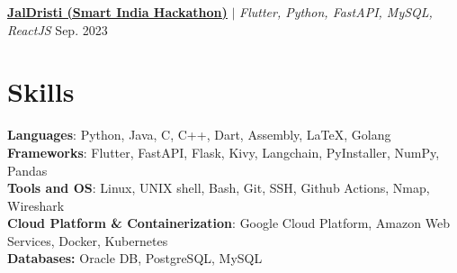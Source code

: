 
\resumeProjectHeading
{\textbf{\href{https://github.com/AM-ash-OR-AM-I/jaldristi}{\underline{JalDristi (Smart India Hackathon)}}} $|$ \emph{ Flutter, Python, FastAPI, MySQL, ReactJS }} {Sep. 2023 }
\resumeItemListStart
{}
\resumeItemListEnd

\resumeSubHeadingListEnd

%
\vspace{-10px}
\section{Skills}
\begin{itemize}[leftmargin=0.15in, label={}]
  \small{\item{
        \textbf{Languages}{: Python, Java, C, C++, Dart, Assembly, LaTeX, Golang} \\
        \textbf{Frameworks}{: Flutter, FastAPI, Flask, Kivy, Langchain, PyInstaller, NumPy, Pandas} \\
        \textbf{Tools and OS}{: Linux, UNIX shell, Bash, Git, SSH, Github Actions, Nmap, Wireshark} \\
        \textbf{Cloud Platform \& Containerization}{: Google Cloud Platform, Amazon Web Services, Docker, Kubernetes} \\
        \textbf{Databases: }{Oracle DB, PostgreSQL, MySQL} \\
        }}

\end{itemize}


